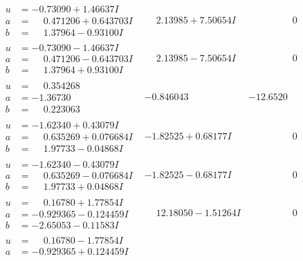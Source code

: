 \documentclass[1p]{elsarticle_modified}
\theoremstyle{definition}
\begin{document}
$$\begin{array}{c|c|c}
 \hline 
\begin{aligned}
u &= -0.73090 + 1.46637 I \\
a &= \phantom{-}0.471206 + 0.643703 I \\
b &= \phantom{-}1.37964 - 0.93100 I\end{aligned}
 & \phantom{-}2.13985 + 7.50654 I & \phantom{-0.000000 } 0 \\ \hline\begin{aligned}
u &= -0.73090 - 1.46637 I \\
a &= \phantom{-}0.471206 - 0.643703 I \\
b &= \phantom{-}1.37964 + 0.93100 I\end{aligned}
 & \phantom{-}2.13985 - 7.50654 I & \phantom{-0.000000 } 0 \\ \hline\begin{aligned}
u &= \phantom{-}0.354268\phantom{ +0.000000I} \\
a &= -1.36730\phantom{ +0.000000I} \\
b &= \phantom{-}0.223063\phantom{ +0.000000I}\end{aligned}
 & -0.846043\phantom{ +0.000000I} & -12.6520\phantom{ +0.000000I} \\ \hline\begin{aligned}
u &= -1.62340 + 0.43079 I \\
a &= \phantom{-}0.635269 + 0.076684 I \\
b &= \phantom{-}1.97733 - 0.04868 I\end{aligned}
 & -1.82525 + 0.68177 I & \phantom{-0.000000 } 0 \\ \hline\begin{aligned}
u &= -1.62340 - 0.43079 I \\
a &= \phantom{-}0.635269 - 0.076684 I \\
b &= \phantom{-}1.97733 + 0.04868 I\end{aligned}
 & -1.82525 - 0.68177 I & \phantom{-0.000000 } 0 \\ \hline\begin{aligned}
u &= \phantom{-}0.16780 + 1.77854 I \\
a &= -0.929365 - 0.124459 I \\
b &= -2.65053 - 0.11583 I\end{aligned}
 & \phantom{-}12.18050 - 1.51264 I & \phantom{-0.000000 } 0 \\ \hline\begin{aligned}
u &= \phantom{-}0.16780 - 1.77854 I \\
a &= -0.929365 + 0.124459 I \\

\end{aligned}
\end{array}$$
\end{document}
